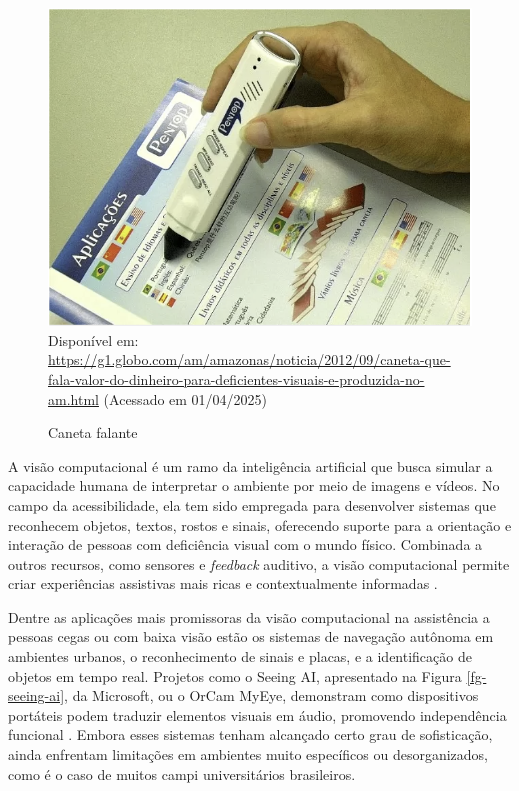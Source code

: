 \begin{figure}[htbp]
  \centering
  \caption{Caneta falante}
  \includegraphics[width=0.8 \textwidth]{Figuras/caneta-fala.png}
  \\
  Disponível em: \url{https://g1.globo.com/am/amazonas/noticia/2012/09/caneta-que-fala-valor-do-dinheiro-para-deficientes-visuais-e-produzida-no-am.html} (Acessado em 01/04/2025)
  \label{fg-caneta}
\end{figure}

A visão computacional é um ramo da inteligência artificial que busca simular a capacidade humana de interpretar o ambiente por meio de imagens e vídeos. No campo da acessibilidade, ela tem sido empregada para desenvolver sistemas que reconhecem objetos, textos, rostos e sinais, oferecendo suporte para a orientação e interação de pessoas com deficiência visual com o mundo físico. Combinada a outros recursos, como sensores e \textit{feedback} auditivo, a visão computacional permite criar experiências assistivas mais ricas e contextualmente informadas \cite{Goodrich2020}.

Dentre as aplicações mais promissoras da visão computacional na assistência a pessoas cegas ou com baixa visão estão os sistemas de navegação autônoma em ambientes urbanos, o reconhecimento de sinais e placas, e a identificação de objetos em tempo real. Projetos como o Seeing AI, apresentado na Figura \ref{fg-seeing-ai}, da Microsoft, ou o OrCam MyEye, demonstram como dispositivos portáteis podem traduzir elementos visuais em áudio, promovendo independência funcional \cite{Li2021}. Embora esses sistemas tenham alcançado certo grau de sofisticação, ainda enfrentam limitações em ambientes muito específicos ou desorganizados, como é o caso de muitos campi universitários brasileiros.

